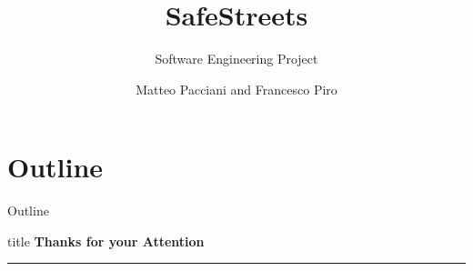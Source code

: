 

\title{\huge \textbf{SafeStreets}}
\subtitle{Software Engineering  Project}



\author{Matteo Pacciani and Francesco Piro}


	
{
	\frame{\titlepage}
}

\section*{Outline}
	\begin{frame}{Outline}
		\vspace{-1cm}
		\textbf{\tableofcontents}
	\end{frame}

\clearpage


\clearpage


\begin{frame}[plain]
	\vfill
	\centering
	\begin{beamercolorbox}[sep=8pt,center,shadow=true,rounded=true]{title}
		\textbf{Thanks for your Attention}\par%
		\color{polimiblue}\noindent\rule{10cm}{1pt} \\
	\end{beamercolorbox}
	\vfill
\end{frame}





